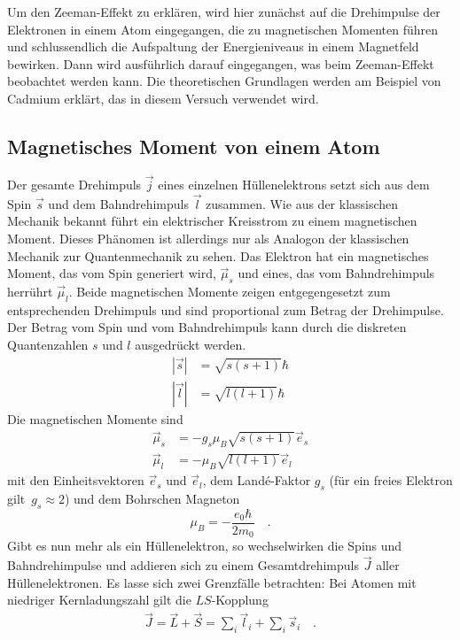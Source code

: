 Um den Zeeman-Effekt zu erklären, wird hier zunächst auf die Drehimpulse der Elektronen in einem Atom eingegangen, die zu magnetischen Momenten führen und schlussendlich die Aufspaltung der Energieniveaus in einem Magnetfeld bewirken. Dann wird ausführlich darauf eingegangen, was beim Zeeman-Effekt beobachtet werden kann. Die theoretischen Grundlagen werden am Beispiel von Cadmium erklärt, das in diesem Versuch verwendet wird.

\subsection{Magnetisches Moment von einem Atom}
Der gesamte Drehimpuls $\vec{j}$ eines einzelnen Hüllenelektrons setzt sich aus dem Spin $\vec{s}$ und dem Bahndrehimpuls $\vec{l}$ zusammen. Wie aus der klassischen Mechanik bekannt führt ein elektrischer Kreisstrom zu einem magnetischen Moment. Dieses Phänomen ist allerdings nur als Analogon der klassischen Mechanik zur Quantenmechanik zu sehen. Das Elektron hat ein magnetisches Moment, das vom Spin generiert wird, $\vec{\mu}_s$ und eines, das vom Bahndrehimpuls herrührt $\vec{\mu}_l$. Beide magnetischen Momente zeigen entgegengesetzt zum entsprechenden Drehimpuls und sind proportional zum Betrag der Drehimpulse. Der Betrag vom Spin und vom Bahndrehimpuls kann durch die diskreten Quantenzahlen $s$ und $l$ ausgedrückt werden.
\begin{align}
	| \vec{s} | &= \sqrt{s(s+1)} \hbar \\
	| \vec{l} | &= \sqrt{l(l+1)} \hbar
\end{align}
Die magnetischen Momente sind 
\begin{align}
	\vec{\mu}_s &= - g_s \mu_B  \sqrt{s(s+1)} \vec{e}_s \\
	\vec{\mu}_l & = - \mu_B  \sqrt{l(l+1)} \vec{e}_l 
\end{align}
mit den Einheitsvektoren $\vec{e}_s$ und $\vec{e}_l$, dem Landé-Faktor $g_s$ (für ein freies Elektron gilt~$g_s \approx 2$) und dem Bohrschen Magneton \\
\begin{equation}
	\mu_B =- \frac{e_0 \hbar}{2 m_0}  \quad .
\end{equation}
Gibt es nun mehr als ein Hüllenelektron, so wechselwirken die Spins und Bahndrehimpulse und addieren sich zu einem Gesamtdrehimpuls $\vec{J}$ aller Hüllenelektronen. Es lasse sich zwei Grenzfälle betrachten: Bei Atomen mit niedriger Kernladungszahl gilt die $LS$-Kopplung
\begin{align}
	\vec{J} = \vec{L} + \vec{S} = \sum_i \vec{l}_i + \sum_i \vec{s}_i \quad .
\end{align}
